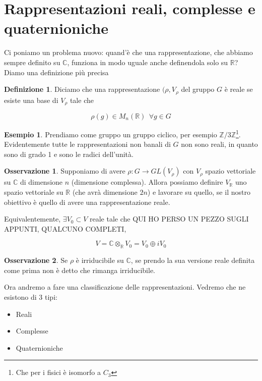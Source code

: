\documentclass[11pt]{article}
\theoremstyle{plain}
\theoremstyle{definition}
\newtheorem{defn}{Definizione}[section]
\newtheorem{exmp}{Esempio}[section]
\newtheorem*{rem}{Osservazione}
\theoremstyle{remark}
\newcommand{\C}{\mathbb{C}}
\newcommand{\R}{\mathbb{R}}
\newcommand{\Z}{\mathbb{Z}}
\begin{document}
\newpage
\section{Rappresentazioni reali, complesse e quaternioniche}

Ci poniamo un problema nuovo: quand'è che una rappresentazione, che abbiamo sempre definito su $\C$, funziona in modo uguale anche definendola solo su $\R$? Diamo una definizione più precisa

\begin{defn}
Diciamo che una rappresentazione $(\rho, V_\rho$ del gruppo $G$ è reale se esiste una base di $V_\rho$ tale che

\[ \rho(g) \in M_n(\R) \ \ \forall g \in G\]

\label{def: rappr reale}
\end{defn}

\begin{exmp}
Prendiamo come gruppo un gruppo ciclico, per esempio $\Z / 3\Z$\footnote{Che per i fisici è isomorfo a $C_3$}. Evidentemente tutte le rappresentazioni non banali di $G$ non sono reali, in quanto sono di grado 1 e sono le radici dell'unità.

\end{exmp}


\begin{rem}
Supponiamo di avere $\rho: G \to GL(V_\rho)$ con $V_\rho$ spazio vettoriale su $\C$ di dimensione $n$ (dimensione complessa). Allora possiamo definire  $V_\R$ uno spazio vettoriale su $\R$ (che avrà dimensione $2n$) e lavorare su quello, se il nostro obiettivo è quello di avere una rappresentazione reale.

Equivalentemente, $\exists V_0 \subset V$ reale tale che QUI HO PERSO UN PEZZO SUGLI APPUNTI, QUALCUNO COMPLETI, 

\[ V = \C \otimes_\R V_0 = V_0 \oplus i V_0\]

\end{rem}




\begin{rem}
Se $\rho$ è irriducibile su $\C$, se prendo la sua versione reale definita come prima non è detto che rimanga irriducibile.

\end{rem}


Ora andremo a fare una classificazione delle rappresentazioni. Vedremo che ne esistono di 3 tipi:
\begin{itemize}
\item Reali
\item Complesse
\item Quaternioniche
\end{itemize}
\end{document}

